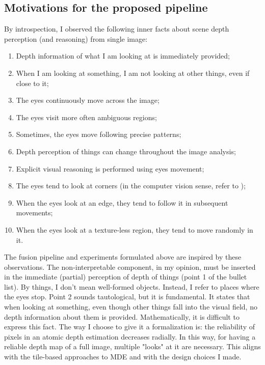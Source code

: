 \subsection{Motivations for the proposed pipeline}
By introspection, I observed the following inner facts about scene depth perception (and reasoning) from single image:
\begin{enumerate}
    \item{
        Depth information of what I am looking at is immediately provided;
    }
    \item{
        When I am looking at something, I am not looking at other things, even if close to it;
    }
    \item{
        The eyes continuously move across the image;
    }
    \item{
        The eyes visit more often ambiguous regions;
    }
    \item{
        Sometimes, the eyes move following precise patterns;
    }
    \item{
        Depth perception of things can change throughout the image analysis;
    }
    \item{
        Explicit visual reasoning is performed using eyes movement;
    }
    \item{
        The eyes tend to look at corners (in the computer vision sense, refer to \cite{computer_vision});
    }
    \item{
        When the eyes look at an edge, they tend to follow it in subsequent movements;
    }
    \item{
        When the eyes look at a texture-less region, they tend to move randomly in it.
    }
\end{enumerate}
The fusion pipeline and experiments formulated above are inspired by these observations.
The non-interpretable component, in my opinion, must be inserted in the immediate (partial) perception of depth of things (point 1 of the bullet list).
By things, I don't mean well-formed objects.
Instead, I refer to places where the eyes stop.
Point 2 sounds tautological, but it is fundamental.
It states that when looking at something, even though other things fall into the visual field, no depth information about them is provided.
Mathematically, it is difficult to express this fact.
The way I choose to give it a formalization is: the reliability of pixels in an atomic depth estimation decreases radially.
In this way, for having a reliable depth map of a full image, multiple "looks" at it are necessary.
This aligns with the tile-based approaches to MDE and with the design choices I made.